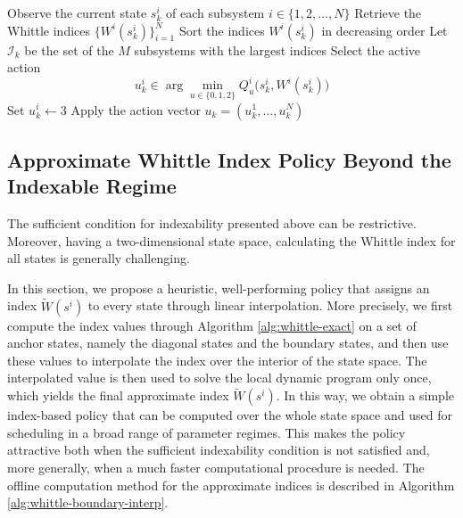 \documentclass[letterpaper,journal]{IEEEtran}
\begin{document}
\begin{algorithm}[ht]
\caption{Implementation of the Whittle index policy}
\label{alg:whittle-online}
\begin{algorithmic}[1]
        \State Observe the current state $s_k^i$ of each subsystem $i\in\{1,2,\dots,N\}$
        \State Retrieve the Whittle indices $\{W^i(s_k^i)\}_{i=1}^N$
        \State Sort the indices $W^i(s_k^i)$ in decreasing order
        \State Let $\mathcal I_k$ be the set of the $M$ subsystems with the largest indices
            \State Select the active action
            \[
            u_k^i \in \arg\min_{u\in\{0,1,2\}} Q_u^i\bigl(s_k^i, W^i(s_k^i)\bigr)
            \]
        \EndFor
            \State Set $u_k^i \leftarrow 3$
        \EndFor
        \State Apply the action vector $u_k=(u_k^1,\dots,u_k^N)$
    \EndFor
\end{algorithmic}
\end{algorithm}
	
	
\subsection{Approximate Whittle Index Policy Beyond the Indexable Regime}\label{sec:AWIP}

The sufficient condition for indexability presented above can be restrictive. Moreover, having a two-dimensional state space, calculating the Whittle index for all states is generally challenging.

In this section, we propose a heuristic, well-performing policy that assigns an index $\widetilde{W}(s^i)$ to every state through linear interpolation. More precisely, we first compute the index values through Algorithm \ref{alg:whittle-exact} on a set of anchor states, namely the diagonal states and the boundary states, and then use these values to interpolate the index over the interior of the state space. The interpolated value is then used to solve the local dynamic program only once, which yields the final approximate index $\widetilde{W}(s^i)$. In this way, we obtain a simple index-based policy that can be computed over the whole state space and used for scheduling in a broad range of parameter regimes. This makes the policy attractive both when the sufficient indexability condition is not satisfied and, more generally, when a much faster computational procedure is needed. The offline computation method for the approximate indices is described in Algorithm \ref{alg:whittle-boundary-interp}.
\end{document}
